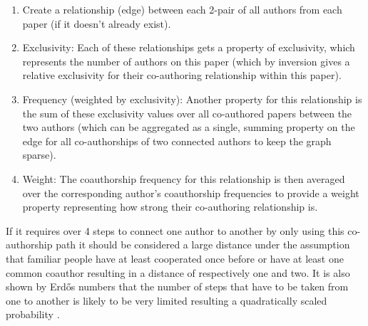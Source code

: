 \begin{enumerate}
  \item Create a relationship (edge) between each 2-pair of all authors from each paper (if it doesn't already exist).
  \item Exclusivity: Each of these relationships gets a property of exclusivity, which represents the number of authors on this paper (which by inversion gives a relative exclusivity for their co-authoring relationship within this paper).
  \item Frequency (weighted by exclusivity): Another property for this relationship is the sum of these exclusivity values over all co-authored papers between the two authors (which can be aggregated as a single, summing property on the edge for all co-authorships of two connected authors to keep the graph sparse).
  \item Weight: The coauthorship frequency for this relationship is then averaged over the corresponding author's coauthorship frequencies to provide a weight property representing how strong their co-authoring relationship is. %
\end{enumerate}

If it requires over 4 steps to connect one author to another by only using this co-authorship path it should be considered a large distance under the assumption that familiar people have at least cooperated once before or have at least one common coauthor resulting in a distance of respectively one and two.
It is also shown by Erd\H{o}s numbers that the number of steps that have to be taken from one to another is likely to be very limited resulting a quadratically scaled probability \cite{balaban2002co}.
